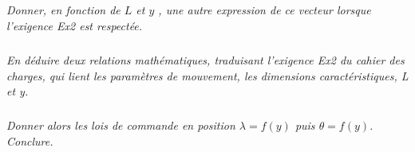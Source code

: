 \subparagraph{}
\textit{Donner, en fonction de $L$ et $y$ , une autre expression de ce vecteur lorsque l’exigence Ex2 est respectée.}
\ifprof
\begin{corrige}
\end{corrige}
\else
\fi

\subparagraph{}
\textit{En déduire deux relations mathématiques, traduisant l’exigence Ex2 du cahier des charges, qui lient les
paramètres de mouvement, les dimensions caractéristiques, L et y.
}
\ifprof
\begin{corrige}
\end{corrige}
\else
\fi

\subparagraph{}
\textit{ Donner alors les lois de commande en position $\lambda= f (y)$ puis $\theta = f(y)$. Conclure.}
\ifprof
\begin{corrige}
\end{corrige}
\else
\fi
